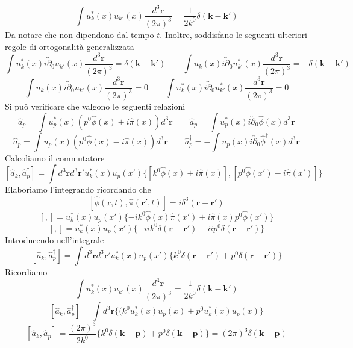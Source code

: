 $$
\int u_k^*(x) u_{k'}(x) \frac{d^3\mathbf{r}}{(2\pi)^3} = \frac{1}{2k^0} \delta(\mathbf{k} - \mathbf{k}')
$$
Da notare che non dipendono dal tempo $t$. Inoltre, soddisfano le seguenti ulteriori regole di ortogonalità generalizzata 
$$
\int u_k^*(x) i \overleftrightarrow{\partial}_0 u_{k'}(x) \frac{d^3\mathbf{r}}{(2\pi)^3} = \delta(\mathbf{k} - \mathbf{k}') \qquad \int u_k(x) i \overleftrightarrow{\partial}_0 u_{k'}^*(x) \frac{d^3\mathbf{r}}{(2\pi)^3} = -\delta(\mathbf{k} - \mathbf{k}')
$$
$$
\int u_k(x) i \overleftrightarrow{\partial}_0 u_{k'}(x) \frac{d^3\mathbf{r}}{(2\pi)^3} = 0 \qquad \int u_k^*(x) i \overleftrightarrow{\partial}_0 u_{k'}^*(x) \frac{d^3\mathbf{r}}{(2\pi)^3} = 0
$$
Si può verificare che valgono le seguenti relazioni
$$
\hat{a}_p = \int u_p^*(x) (p^0 \hat{\phi}(x) + i \hat{\pi}(x)) d^3\mathbf{r} \qquad \hat{a}_p = \int u_p^*(x) i \overleftrightarrow{\partial}_0 \hat{\phi}(x) d^3\mathbf{r}
$$
$$
\hat{a}_p^\dagger = \int u_p(x) (p^0 \hat{\phi}(x) - i \hat{\pi}(x)) d^3\mathbf{r} \qquad \hat{a}_p^\dagger = - \int u_p(x) i \overleftrightarrow{\partial}_0 \hat{\phi}^\dagger(x) d^3\mathbf{r}
$$
Calcoliamo il commutatore
$$
[\hat{a}_k, \hat{a}_p^\dagger] = \int d^3\mathbf{r} d^3\mathbf{r}' u_k^*(x) u_p(x') \{ [k^0 \hat{\phi}(x) + i \hat{\pi}(x)], [p^0 \hat{\phi}(x') - i \hat{\pi}(x')] \}
$$
Elaboriamo l'integrando ricordando che
$$
[\hat{\phi}(\mathbf{r}, t), \hat{\pi}(\mathbf{r}', t)] = i\delta^3(\mathbf{r} - \mathbf{r}')
$$
$$
[,] = u_k^*(x) u_p(x') \{ -i k^0 \hat{\phi}(x) \hat{\pi}(x') + i \hat{\pi}(x) p^0 \hat{\phi}(x') \}
$$$$
[,] = u_k^*(x) u_p(x') \{ -i i k^0 \delta(\mathbf{r} - \mathbf{r}') - i i p^0 \delta(\mathbf{r} - \mathbf{r}') \}
$$
Introducendo nell'integrale
$$
[\hat{a}_k, \hat{a}_p^\dagger] = \int d^3\mathbf{r} d^3\mathbf{r}' u_k^*(x) u_p(x') \{ k^0 \delta(\mathbf{r} - \mathbf{r}') + p^0 \delta(\mathbf{r} - \mathbf{r}') \}
$$
Ricordiamo
$$
\int u_k^*(x) u_{k'}(x) \frac{d^3\mathbf{r}}{(2\pi)^3} = \frac{1}{2k^0} \delta(\mathbf{k} - \mathbf{k}')
$$
$$
[\hat{a}_k, \hat{a}_p^\dagger] = \int d^3\mathbf{r} \{ (k^0 u_k^*(x) u_p(x) + p^0 u_k^*(x) u_p(x) \}
$$
$$
[\hat{a}_k, \hat{a}_p^\dagger] = \frac{(2\pi)^3}{2k^0} \{ k^0 \delta(\mathbf{k} - \mathbf{p}) + p^0 \delta(\mathbf{k} - \mathbf{p}) \} = (2\pi)^3 \delta(\mathbf{k} - \mathbf{p})
$$
